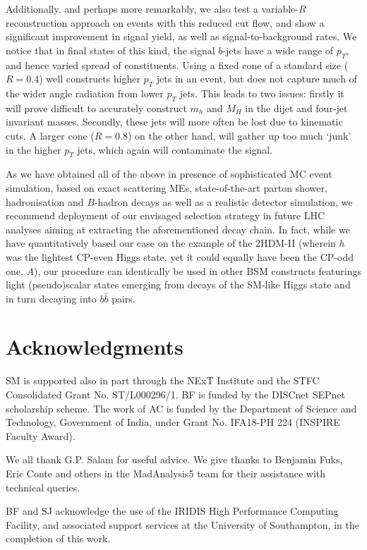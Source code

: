 \documentclass[12pt]{article}
\begin{document}
Additionally, and perhaps more remarkably, we also test a variable-$R$ reconstruction approach on events with this reduced cut flow, and show a significant improvement in signal yield, as well as signal-to-background rates. We notice that in final states of this kind, the signal $b$-jets have a wide range of $p_T$, and hence varied spread of constituents. Using a fixed cone of a standard size ($R=0.4$) well constructs higher $p_T$ jets in an event, but does not capture much of the wider angle radiation from lower $p_T$ jets. This leads to two issues: firstly it will prove difficult to accurately construct $m_h$ and $M_H$ in the dijet and four-jet invariant masses. Secondly, these jets will more often be lost due to kinematic cuts. A larger cone ($R=0.8$) on the other hand, will gather up too much `junk' in the higher $p_T$ jets, which again will contaminate the signal.

As we have obtained all of the above in presence of sophisticated MC event simulation, based on exact  scattering MEs, state-of-the-art parton shower, hadronisation and $B$-hadron decays as well as a realistic detector simulation, we recommend deployment of our envisaged selection strategy in future LHC analyses aiming at extracting the aforementioned decay chain. In fact, while we have quantitatively based our case on the example of the 2HDM-II (wherein $h$ was the lightest CP-even Higgs state, yet it could equally have been the CP-odd one, $A$), our procedure can identically be used in other BSM constructs featurings light (pseudo)scalar states emerging from decays of the SM-like Higgs state and in turn decaying into $b\bar b$ pairs.


\section*{Acknowledgments}
SM is supported also in part through the NExT Institute and the STFC Consolidated Grant No. ST/L000296/1. BF is funded by the DISCnet SEPnet scholarship scheme. The work of AC is funded by the Department of Science and Technology, Government of India, under Grant No. IFA18-PH 224 (INSPIRE Faculty Award).

We all thank G.P. Salam for useful advice. We give thanks to Benjamin Fuks, Eric Conte and others in the MadAnalysis5 team for their assistance with technical queries.

BF and SJ acknowledge the use of the IRIDIS High Performance Computing Facility, and associated support services at the University of Southampton, in the completion of this work.
\end{document}
